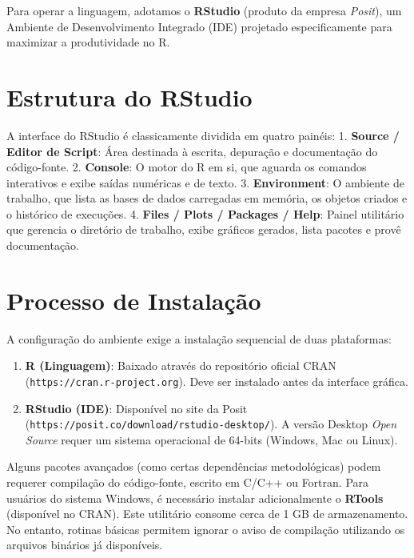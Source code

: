 \documentclass[
  brazilian,
  11pt,
  a4paper,
  open = right,
  twoside = true]{scrbook}
\providecommand{\tightlist}{%
  \setlength{\itemsep}{0pt}\setlength{\parskip}{0pt}}
\begin{document}
Para operar a linguagem, adotamos o \textbf{RStudio} (produto da empresa
\emph{Posit}), um Ambiente de Desenvolvimento Integrado (IDE) projetado
especificamente para maximizar a produtividade no R.

\section{Estrutura do RStudio}\label{estrutura-do-rstudio}

A interface do RStudio é classicamente dividida em quatro painéis: 1.
\textbf{Source / Editor de Script}: Área destinada à escrita, depuração
e documentação do código-fonte. 2. \textbf{Console}: O motor do R em si,
que aguarda os comandos interativos e exibe saídas numéricas e de texto.
3. \textbf{Environment}: O ambiente de trabalho, que lista as bases de
dados carregadas em memória, os objetos criados e o histórico de
execuções. 4. \textbf{Files / Plots / Packages / Help}: Painel
utilitário que gerencia o diretório de trabalho, exibe gráficos gerados,
lista pacotes e provê documentação.

\section{Processo de Instalação}\label{processo-de-instalauxe7uxe3o}

A configuração do ambiente exige a instalação sequencial de duas
plataformas:

\begin{enumerate}
\def\labelenumi{\arabic{enumi}.}
\tightlist
\item
  \textbf{R (Linguagem)}: Baixado através do repositório oficial CRAN
  (\texttt{https://cran.r-project.org}). Deve ser instalado antes da
  interface gráfica.
\item
  \textbf{RStudio (IDE)}: Disponível no site da Posit
  (\texttt{https://posit.co/download/rstudio-desktop/}). A versão
  Desktop \emph{Open Source} requer um sistema operacional de 64-bits
  (Windows, Mac ou Linux).
\end{enumerate}

\begin{tcolorbox}[enhanced jigsaw, arc=.35mm, bottomrule=.15mm, bottomtitle=1mm, breakable, colback=white, colbacktitle=quarto-callout-note-color!10!white, colframe=quarto-callout-note-color-frame, coltitle=black, left=2mm, leftrule=.75mm, opacityback=0, opacitybacktitle=0.6, rightrule=.15mm, title=\textcolor{quarto-callout-note-color}{\faInfo}\hspace{0.5em}{Compilação e RTools (Usuários de Windows)}, titlerule=0mm, toprule=.15mm, toptitle=1mm]

Alguns pacotes avançados (como certas dependências metodológicas) podem
requerer compilação do código-fonte, escrito em C/C++ ou Fortran. Para
usuários do sistema Windows, é necessário instalar adicionalmente o
\textbf{RTools} (disponível no CRAN). Este utilitário consome cerca de 1
GB de armazenamento. No entanto, rotinas básicas permitem ignorar o
aviso de compilação utilizando os arquivos binários já disponíveis.

\end{tcolorbox}
\end{document}
